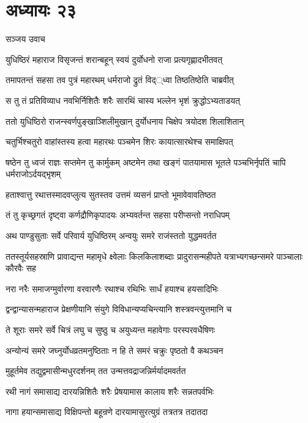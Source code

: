 \chapter{अध्यायः २३}
\twolineshloka
{सञ्जय उवाच}
{}


\twolineshloka
{युधिष्ठिरं महाराज विसृजन्तं शरान्बहून्}
{स्वयं दुर्योधनो राजा प्रत्यगृह्णादभीतवत्}


\twolineshloka
{तमापतन्तं सहसा तव पुत्रं महारथम्}
{धर्मराजो द्रुतं विद््ध्वा तिष्ठतिष्ठेति चाब्रवीत्}


\twolineshloka
{स तु तं प्रतिविव्याध नवभिर्निशितैः शरैः}
{सारथिं चास्य भल्लेन भृशं क्रुद्धोऽभ्यताडयत्}


\twolineshloka
{ततो युधिष्ठिरो राजन्स्वर्णपुङ्खाञ्शिलीमुखान्}
{दुर्योधनाय चिक्षेप त्रयोदश शिलाशितान्}


\twolineshloka
{चतुर्भिश्चतुरो वाहांस्तस्य हत्वा महारथः}
{पञ्चमेन शिरः कायात्सारथेश्च समाक्षिपत्}


\threelineshloka
{षष्ठेन तु ध्वजं राज्ञः सप्तमेन तु कार्मुकम्}
{अष्टमेन तथा खङ्गं पातयामास भूतले}
{पञ्चभिर्नृपतिं चापि धर्मराजोऽर्दयद्भृशम्}


\twolineshloka
{हताश्वात्तु रथात्तस्मादवप्लुत्य सुतस्तव}
{उत्तमं व्यसनं प्राप्तो भूमावेवावतिष्ठत}


\twolineshloka
{तं तु कृच्छ्रगतं दृष्ट्वा कर्णद्रौणिकृपादयः}
{अभ्यवर्तन्त सहसा परीप्सन्तो नराधिपम्}


\twolineshloka
{अथ पाण्डुसुताः सर्वे परिवार्य युधिष्ठिरम्}
{अन्वयुः समरे राजंस्ततो युद्धमवर्तत}


ततस्तूर्यसहस्राणि प्रावाद्यन्त महामृधे
\twolineshloka
{क्ष्वेलाः किलकिलाशब्दाः प्रादुरासन्महीपते}
{यत्राभ्यगच्छन्समरे पाञ्चालाः कौरवैः सह}


\twolineshloka
{नरा नरैः समाजग्मुर्वारणा वरवारणैः}
{रथाश्च रथिभिः सार्धं हयाश्च हयसादिभिः}


\twolineshloka
{द्वन्द्वान्यासन्महाराज प्रेक्षणीयानि संयुगे}
{विविधान्यप्यचिन्त्यानि शस्त्रवन्त्युत्तमानि च}


\twolineshloka
{ते शूराः समरे सर्वे चित्रं लघु च सुष्ठु च}
{अयुध्यन्त महावेगाः परस्परवधैषिणः}


\twolineshloka
{अन्योन्यं समरे जघ्नुर्योधव्रतमनुष्ठिताः}
{न हि ते समरं चक्रुः पृष्ठतो वै कथञ्चन}


\twolineshloka
{मुहूर्तमेव तद्युद्वमासीन्मधुरदर्शनम्}
{तत उन्मत्तवद्राजन्निर्मर्यादमवर्तत}


\twolineshloka
{रथी नागं समासाद्य दारयन्निशितैः शरैः}
{प्रेषयामास कालाय शरैः सन्नतपर्वभिः}


\twolineshloka
{नागा हयान्समासाद्य विक्षिपन्तो बहून्रणे}
{दारयामासुरत्युग्रं तत्रतत्र तदातदा}


